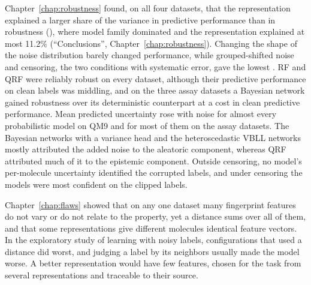 Chapter~\ref{chap:robustness} found, on all four datasets, that the representation explained a larger share of the variance in predictive performance than in robustness (\aucnorm), where model family dominated and the representation explained at most 11.2\% (``Conclusions'', Chapter~\ref{chap:robustness}). Changing the shape of the noise distribution barely changed performance, while grouped-shifted noise and censoring, the two conditions with systematic error, gave the lowest \aucnorm{}. RF and QRF were reliably robust on every dataset, although their predictive performance on clean labels was middling, and on the three assay datasets a Bayesian network gained robustness over its deterministic counterpart at a cost in clean predictive performance. Mean predicted uncertainty rose with noise for almost every probabilistic model on QM9 and for most of them on the assay datasets. The Bayesian networks with a variance head and the heteroscedastic VBLL networks mostly attributed the added noise to the aleatoric component, whereas QRF attributed much of it to the epistemic component. Outside censoring, no model's per-molecule uncertainty identified the corrupted labels, and under censoring the models were most confident on the clipped labels.

Chapter~\ref{chap:flaws} showed that on any one dataset many fingerprint features do not vary or do not relate to the property, yet a distance sums over all of them, and that some representations give different molecules identical feature vectors. In the exploratory study of learning with noisy labels, configurations that used a distance did worst, and judging a label by its neighbors usually made the model worse. A better representation would have few features, chosen for the task from several representations and traceable to their source.

